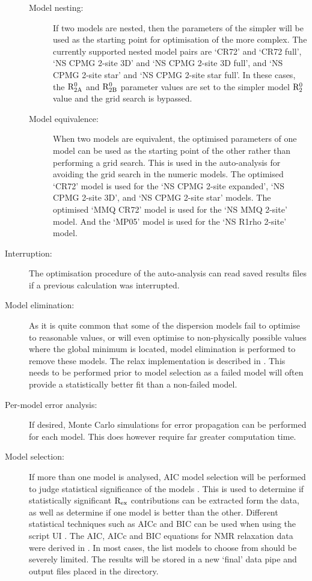 \begin{description}
\begin{description}
\item[Model nesting:]  If two models are nested, then the parameters of the simpler will be used as the starting point for optimisation of the more complex.  The currently supported nested model pairs are `CR72' and `CR72 full', `NS CPMG 2-site 3D' and `NS CPMG 2-site 3D full', and `NS CPMG 2-site star' and `NS CPMG 2-site star full'.  In these cases, the $\mathrm{R}_\mathrm{2A}^0$ and $\mathrm{R}_\mathrm{2B}^0$ parameter values are set to the simpler model $\mathrm{R}_2^0$ value and the grid search is bypassed.
\item[Model equivalence:]  When two models are equivalent, the optimised parameters of one model can be used as the starting point of the other rather than performing a grid search.  This is used in the auto-analysis for avoiding the grid search in the numeric models.  The optimised `CR72' model is used for the `NS CPMG 2-site expanded', `NS CPMG 2-site 3D', and  `NS CPMG 2-site star' models.  The optimised `MMQ CR72' model is used for the `NS MMQ 2-site' model.  And the `MP05' model is used for the `NS R1rho 2-site' model.
\end{description}
\item[Interruption:]  The optimisation procedure of the auto-analysis can read saved results files if a previous calculation was interrupted.
\item[Model elimination:]  As it is quite common that some of the dispersion models fail to optimise to reasonable values, or will even optimise to non-physically possible values where the global minimum is located, model elimination is performed to remove these models.  The relax implementation is described in \citet{dAuvergneGooley06}.  This needs to be performed prior to model selection as a failed model will often provide a statistically better fit than a non-failed model.
\item[Per-model error analysis:]  If desired, Monte Carlo simulations for error propagation can be performed for each model.  This does however require far greater computation time.
\item[Model selection:]  If more than one model is analysed, AIC model selection will be performed to judge statistical significance of the models \citep{Akaike73}.  This is used to determine if statistically significant $\mathrm{R}_\textrm{ex}$ contributions can be extracted form the data, as well as determine if one model is better than the other.  Different statistical techniques such as AICc and BIC can be used when using the script UI \citep{HurvichTsai89,Schwarz78}.  The AIC, AICc and BIC equations for NMR relaxation data were derived in \citet{dAuvergneGooley03}.  In most cases, the list models to choose from should be severely limited.  The results will be stored in a new `final' data pipe and output files placed in the  directory.

\end{description}
